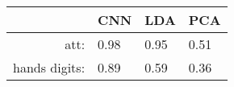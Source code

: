 \begin{tabular}{|r|l|l|l|}
  \hline
    & CNN & LDA & PCA \\
  \hline
  att: & 0.98 & 0.95 & 0.51 \\
  \hline
  hands digits: & 0.89 & 0.59 & 0.36 \\
  \hline
\end{tabular}
